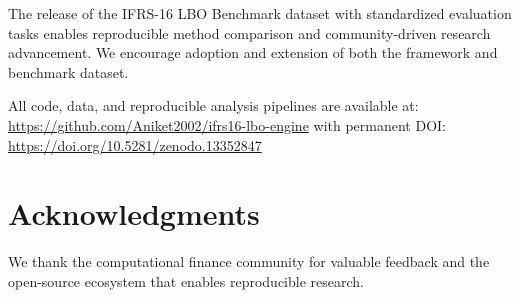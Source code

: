 \documentclass[11pt,a4paper]{article}
\begin{document}
The release of the IFRS-16 LBO Benchmark dataset with standardized evaluation tasks enables reproducible method comparison and community-driven research advancement. We encourage adoption and extension of both the framework and benchmark dataset.

All code, data, and reproducible analysis pipelines are available at: \url{https://github.com/Aniket2002/ifrs16-lbo-engine} with permanent DOI: \url{https://doi.org/10.5281/zenodo.13352847}

\section*{Acknowledgments}

We thank the computational finance community for valuable feedback and the open-source ecosystem that enables reproducible research.
\end{document}
